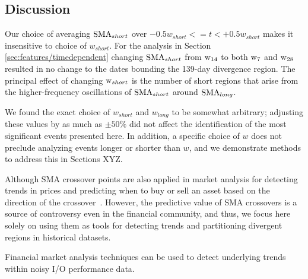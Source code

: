 \subsection {Discussion}
\label{sec:results/discussion}


Our choice of averaging $\textup{SMA}_{short}$ over ${-0.5w_{short} <= t < +0.5w_{short}}$ makes it insensitive to choice of $w_{short}$.
For the analysis in Section \ref{sec:features/timedependent} changing $\textup{SMA}_{short}$ from $\textup{w}_{14}$ to both $\textup{w}_{7}$ and $\textup{w}_{28}$ resulted in no change to the dates bounding the 139-day divergence region.
The principal effect of changing $\textup{w}_{short}$ is the number of short regions that arise from the higher-frequency oscillations of $\textup{SMA}_{short}$ around $\textup{SMA}_{long}$.


We found the exact choice of $w_{short}$ and $w_{long}$ to be somewhat arbitrary; adjusting these values by as much as $\pm 50\%$ did not affect the identification of the most significant events presented here.
In addition, a specific choice of $w$ does not preclude analyzing events longer or shorter than $w$, and we demonstrate methods to address this in Sections XYZ.

Although SMA crossover points are also applied in market analysis for detecting trends in prices and predicting when to buy or sell an asset based on the direction of the crossover~\cite{brock1992simple}.
However, the predictive value of SMA crossovers is a source of controversy even in the financial community, and thus, we focus here solely on using them as tools for detecting trends and partitioning divergent regions in historical datasets.

Financial market analysis techniques can be used to detect underlying trends within noisy I/O performance data.
